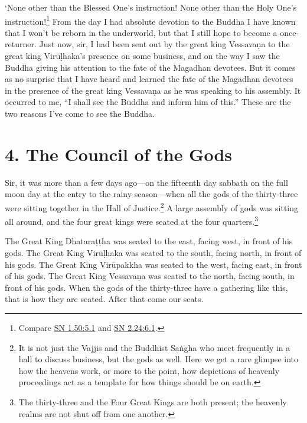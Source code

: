 \documentclass[12pt,openany]{book}%
\begin{document}
‘None other than the Blessed One’s instruction! None other than the Holy One’s instruction!\footnote{Compare \href{https://suttacentral.net/sn1.50/en/sujato\#5.1}{SN 1.50:5.1} and \href{https://suttacentral.net/sn2.24/en/sujato\#6.1}{SN 2.24:6.1}. } From the day I had absolute devotion to the Buddha I have known that I won’t be reborn in the underworld, but that I still hope to become a once-returner. Just now, sir, I had been sent out by the great king \textsanskrit{Vessavaṇa} to the great king \textsanskrit{Virūḷhaka}’s presence on some business, and on the way I saw the Buddha giving his attention to the fate of the Magadhan devotees. But it comes as no surprise that I have heard and learned the fate of the Magadhan devotees in the presence of the great king \textsanskrit{Vessavaṇa} as he was speaking to his assembly. It occurred to me, “I shall see the Buddha and inform him of this.” These are the two reasons I’ve come to see the Buddha. 

\section*{4. The Council of the Gods }

Sir, it was more than a few days ago—on the fifteenth day sabbath on the full moon day at the entry to the rainy season—when all the gods of the thirty-three were sitting together in the Hall of Justice.\footnote{It is not just the Vajjis and the Buddhist \textsanskrit{Saṅgha} who meet frequently in a hall to discuss business, but the gods as well. Here we get a rare glimpse into how the heavens work, or more to the point, how depictions of heavenly proceedings act as a template for how things should be on earth. } A large assembly of gods was sitting all around, and the four great kings were seated at the four quarters.\footnote{The thirty-three and the Four Great Kings are both present; the heavenly realms are not shut off from one another. } 

The Great King \textsanskrit{Dhataraṭṭha} was seated to the east, facing west, in front of his gods. The Great King \textsanskrit{Virūḷhaka} was seated to the south, facing north, in front of his gods. The Great King \textsanskrit{Virūpakkha} was seated to the west, facing east, in front of his gods. The Great King \textsanskrit{Vessavaṇa} was seated to the north, facing south, in front of his gods. When the gods of the thirty-three have a gathering like this, that is how they are seated. After that come our seats. 
\end{document}
